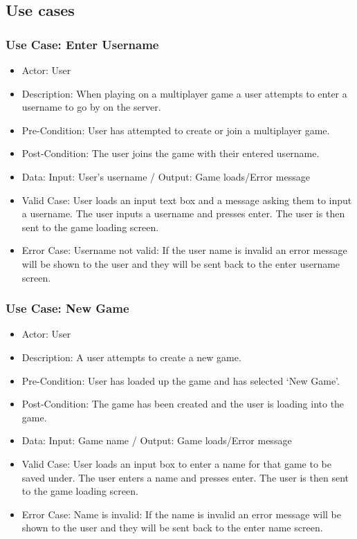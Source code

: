 \documentclass{article}
\begin{document}
\subsection{Use cases}%
\label{subsec:cases}
\subsubsection{Use Case: Enter Username}
\begin{itemize}
	\item Actor: User
	\item Description: When playing on a multiplayer game a user attempts to enter a username to go by on the server.
	\item Pre-Condition: User has attempted to create or join a multiplayer game.
	\item Post-Condition: The user joins the game with their entered username.
	\item Data: Input: User’s username / Output: Game loads/Error message
	\item Valid Case: User loads an input text box and a message asking them to input a username. The user inputs a username and presses enter. The user is then sent to the game loading screen.
	\item Error Case: Username not valid: If the user name is invalid an error message will be shown to the user and they will be sent back to the enter username screen.

\end{itemize}

\subsubsection{Use Case: New Game}
\begin{itemize}
	\item Actor: User
	\item Description: A user attempts to create a new game.
	\item Pre-Condition: User has loaded up the game and has selected ‘New Game’.
	\item Post-Condition: The game has been created and the user is loading into the game.
	\item Data: Input: Game name / Output: Game loads/Error message
	\item Valid Case: User loads an input box to enter a name for that game to be saved under. The user enters a name and presses enter. The user is then sent to the game loading screen.
	\item Error Case: Name is invalid: If the name is invalid an error message will be shown to the user and they will be sent back to the enter name screen.

\end{itemize}
\end{document}
